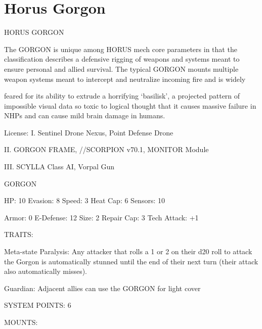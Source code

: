 \section{Horus Gorgon}

                                                                                                                           
                                              HORUS GORGON  

The GORGON is unique among HORUS mech core parameters in that the classification describes a  
defensive rigging of weapons and systems meant to ensure personal and allied survival. The typical  
GORGON mounts multiple weapon systems meant to intercept and neutralize incoming fire and is widely  

feared for its ability to extrude a horrifying ‘basilisk’, a projected pattern of impossible visual data so toxic to  
logical thought that it causes massive failure in NHPs and can cause mild brain damage in humans.  

                                                                                                                      


                                                   License:  
I. Sentinel Drone Nexus, Point Defense Drone
 
II. GORGON FRAME,  //SCORPION v70.1, MONITOR Module
 
III. SCYLLA Class AI, Vorpal Gun
 

                                                 GORGON 

 HP: 10         Evasion: 8                            Speed: 3            Heat Cap: 6        Sensors: 10 

 Armor: 0       E-Defense: 12                         Size: 2             Repair Cap: 3      Tech Attack:  
                                                                                             +1 

                                                   TRAITS: 

 Meta-state Paralysis: Any attacker that rolls a 1 or 2 on their d20 roll to attack the Gorgon is  
 automatically stunned until the end of their next turn (their attack also automatically misses).
 
 Guardian: Adjacent allies can use the GORGON for light cover 

                                             SYSTEM POINTS: 6 

                                                  MOUNTS: 

